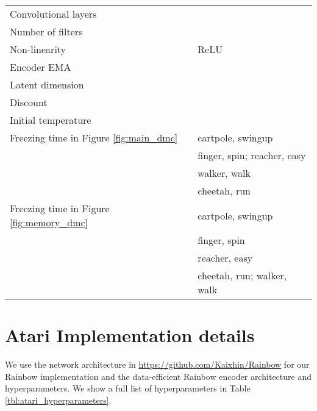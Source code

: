 \documentclass{article}
\begin{document}
\begin{table*}[ht]
\begin{center}
\begin{small}
\begin{tabular}{ll}
Convolutional layers &  \\
Number of filters &  \\
Non-linearity & ReLU \\
Encoder EMA  &  \\
Latent dimension &  \\
Discount  &  \\
Initial temperature &  \\
Freezing time  in Figure \ref{fig:main_dmc} 
 &  cartpole, swingup \\
 &  finger, spin; reacher, easy \\
 &  walker, walk  \\
 &  cheetah, run \\
Freezing time  in Figure \ref{fig:memory_dmc} 
 &  cartpole, swingup \\
 &  finger, spin \\
 &  reacher, easy  \\
 &  cheetah, run; walker, walk  \\
\bottomrule
\end{tabular}
\end{small}
\label{tbl:dmc_hyperparameters}
\end{center}
\vskip -0.1in
\end{table*} 

\section{Atari Implementation details} \label{appendix:atari_implementation_details}
We use the network architecture in \url{https://github.com/Kaixhin/Rainbow} for our Rainbow \citep{hessel2018rainbow} implementation and the data-efficient Rainbow \citep{van2019use} encoder architecture and hyperparameters. We show a full list of hyperparameters in Table \ref{tbl:atari_hyperparameters}. 
\end{document}
